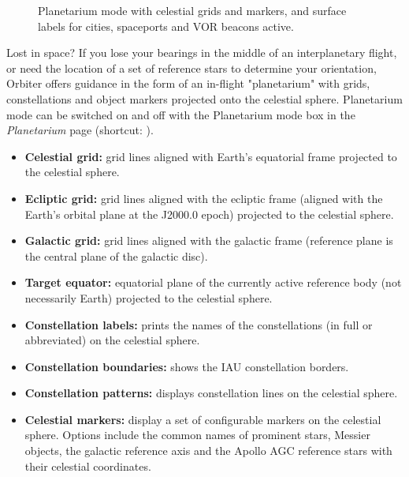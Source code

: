 \documentclass[Orbiter User Manual.tex]{subfiles}
\begin{document}
\begin{figure}[H]
	\centering
	\caption{Planetarium mode with celestial grids and markers, and surface labels for cities, spaceports and VOR beacons active.}
\end{figure}

\noindent
Lost in space? If you lose your bearings in the middle of an interplanetary flight, or need the location of a set of reference stars to determine your orientation, Orbiter offers guidance in the form of an in-flight "planetarium" with grids, constellations and object markers projected onto the celestial sphere. Planetarium mode can be switched on and off with the Planetarium mode box in the \textit{Planetarium} page (shortcut: ).


\begin{figure}[H]
	\centering
\end{figure}

\begin{itemize}
\item \textbf{Celestial grid:} grid lines aligned with Earth’s equatorial frame projected to the celestial sphere.
\item \textbf{Ecliptic grid:} grid lines aligned with the ecliptic frame (aligned with the Earth’s orbital plane at the J2000.0 epoch) projected to the celestial sphere.
\item \textbf{Galactic grid:} grid lines aligned with the galactic frame (reference plane is the central plane of the galactic disc).
\item \textbf{Target equator:} equatorial plane of the currently active reference body (not necessarily Earth) projected to the celestial sphere.
\item \textbf{Constellation labels:} prints the names of the constellations (in full or abbreviated) on the celestial sphere.
\item \textbf{Constellation boundaries:} shows the IAU constellation borders.
\item \textbf{Constellation patterns:} displays constellation lines on the celestial sphere.
\item \textbf{Celestial markers:} display a set of configurable markers on the celestial sphere. Options include the common names of prominent stars, Messier objects, the galactic reference axis and the Apollo AGC reference stars with their celestial coordinates.
\end{itemize}
\end{document}
